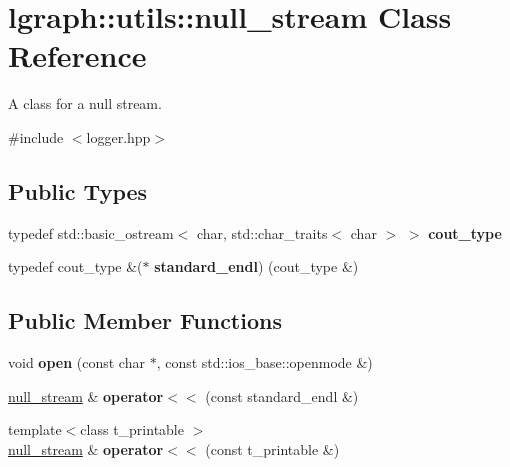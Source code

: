 \hypertarget{classlgraph_1_1utils_1_1null__stream}{}\section{lgraph\+:\+:utils\+:\+:null\+\_\+stream Class Reference}
\label{classlgraph_1_1utils_1_1null__stream}


A class for a null stream.  




{\ttfamily \#include $<$logger.\+hpp$>$}

\subsection*{Public Types}
\begin{DoxyCompactItemize}
\item 
typedef std\+::basic\+\_\+ostream$<$ char, std\+::char\+\_\+traits$<$ char $>$ $>$ {\bfseries cout\+\_\+type}\hypertarget{classlgraph_1_1utils_1_1null__stream_ae3f818cbd342cb6da9f15677252da938}{}\label{classlgraph_1_1utils_1_1null__stream_ae3f818cbd342cb6da9f15677252da938}

\item 
typedef cout\+\_\+type \&($\ast$ {\bfseries standard\+\_\+endl}) (cout\+\_\+type \&)\hypertarget{classlgraph_1_1utils_1_1null__stream_ada7be393792a0f7b90452c981a279d08}{}\label{classlgraph_1_1utils_1_1null__stream_ada7be393792a0f7b90452c981a279d08}

\end{DoxyCompactItemize}
\subsection*{Public Member Functions}
\begin{DoxyCompactItemize}
\item 
void {\bfseries open} (const char $\ast$, const std\+::ios\+\_\+base\+::openmode \&)\hypertarget{classlgraph_1_1utils_1_1null__stream_a4b1d2687e779efef7d4995bcede83448}{}\label{classlgraph_1_1utils_1_1null__stream_a4b1d2687e779efef7d4995bcede83448}

\item 
\hyperlink{classlgraph_1_1utils_1_1null__stream}{null\+\_\+stream} \& {\bfseries operator$<$$<$} (const standard\+\_\+endl \&)\hypertarget{classlgraph_1_1utils_1_1null__stream_a6dd6b8cde39e03fe63eb2feef89ebc11}{}\label{classlgraph_1_1utils_1_1null__stream_a6dd6b8cde39e03fe63eb2feef89ebc11}

\item 
{\footnotesize template$<$class t\+\_\+printable $>$ }\\\hyperlink{classlgraph_1_1utils_1_1null__stream}{null\+\_\+stream} \& {\bfseries operator$<$$<$} (const t\+\_\+printable \&)\hypertarget{classlgraph_1_1utils_1_1null__stream_a633f62bff5dd6e4973674d2f109732cf}{}\label{classlgraph_1_1utils_1_1null__stream_a633f62bff5dd6e4973674d2f109732cf}

\end{DoxyCompactItemize}


